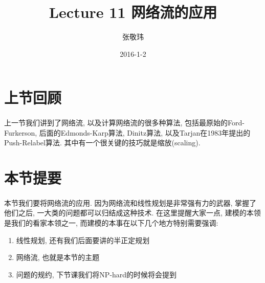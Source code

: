 \documentclass[a4paper]{article}
\title{Lecture 11 网络流的应用}
\date{2016-1-2}
\author{张敬玮}
\begin{document}
    \maketitle
    \section{上节回顾}
        \paragraph{}上一节我们讲到了网络流, 以及计算网络流的很多种算法, 包括最原始的Ford-Furkerson, 后面的Edmonds-Karp算法, Dinitz算法, 以及Tarjan在1983年提出的Push-Relabel算法. 其中有一个很关键的技巧就是缩放(scaling). 
    \section{本节提要}
        \paragraph{}本节我们要将网络流的应用. 因为网络流和线性规划是非常强有力的武器, 掌握了他们之后, 一大类的问题都可以归结成这种技术. 在这里提醒大家一点, 建模的本领是我们的看家本领之一, 而建模的本事在以下几个地方特别需要强调: 
        \begin{enumerate}
        \item 线性规划, 还有我们后面要讲的半正定规划
        \item 网络流, 也就是本节的主题
        \item 问题的规约, 下节课我们将NP-hard的时候将会提到
        \end{enumerate}
\end{document}

